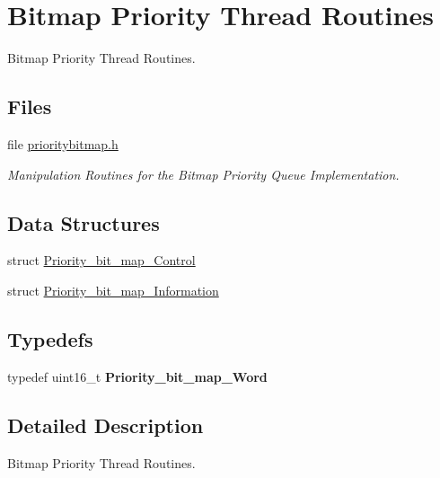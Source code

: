 \hypertarget{group__RTEMSScorePriorityBitmap}{}\section{Bitmap Priority Thread Routines}
\label{group__RTEMSScorePriorityBitmap}


Bitmap Priority Thread Routines.  


\subsection*{Files}
\begin{DoxyCompactItemize}
\item 
file \mbox{\hyperlink{prioritybitmap_8h}{prioritybitmap.\+h}}
\begin{DoxyCompactList}\small\item\em Manipulation Routines for the Bitmap Priority Queue Implementation. \end{DoxyCompactList}\end{DoxyCompactItemize}
\subsection*{Data Structures}
\begin{DoxyCompactItemize}
\item 
struct \mbox{\hyperlink{structPriority__bit__map__Control}{Priority\+\_\+bit\+\_\+map\+\_\+\+Control}}
\item 
struct \mbox{\hyperlink{structPriority__bit__map__Information}{Priority\+\_\+bit\+\_\+map\+\_\+\+Information}}
\end{DoxyCompactItemize}
\subsection*{Typedefs}
\begin{DoxyCompactItemize}
\item 
\mbox{\label{group__RTEMSScorePriorityBitmap_ga37396fc0890381b9f94cf8794ae73a72}} 
typedef uint16\+\_\+t {\bfseries Priority\+\_\+bit\+\_\+map\+\_\+\+Word}
\end{DoxyCompactItemize}


\subsection{Detailed Description}
Bitmap Priority Thread Routines. 


